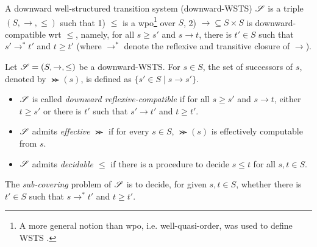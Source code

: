 %

\begin{definition}
A downward well-structured transition system (downward-WSTS) $\mathscr{S}$ is a triple $(S, \rightarrow, \le)$ such that 1) $\le$ is a wpo\footnote{A more general notion than wpo, i.e. well-quasi-order, was used to define WSTS \cite{FS01}. } over $S$, 2) $\rightarrow \subseteq S \times S$ is downward-compatible wrt $\le$, namely, for all $s \ge s'$ and $s \rightarrow t$, there is $t' \in S$ such that $s' \rightarrow^* t'$ and $t \ge t'$ (where $ \rightarrow^*$ denote the reflexive and transitive closure of $\rightarrow$).
\end{definition}


Let $\mathscr{S} = (S, \rightarrow, \le)$ be a downward-WSTS. For $s \in S$, the set of successors of $s$, denoted by $\Succ(s)$, is defined as $\{s' \in S \mid s \rightarrow s'\}$.
\begin{itemize}
\item $\mathscr{S}$ is called \emph{downward reflexive-compatible} if for all $s \ge s'$ and $s \rightarrow t$, either $t \ge s'$ or there is $t'$ such that $s' \rightarrow t'$ and $t \ge t'$.
%
\item $\mathscr{S}$ admits \emph{effective} $\Succ$ if for every $s \in S$, $\Succ(s)$ is effectively computable from $s$.
%
\item $\mathscr{S}$ admits \emph{decidable $\le$} if there is a procedure to decide $s \le t$ for all $s, t \in S$.
%
\end{itemize}

The \emph{sub-covering} problem of $\mathscr{S}$ is to decide, for given $s, t \in S$, whether %
there is $t' \in S$ such that $s \rightarrow^* t'$ and $t \ge t'$.

